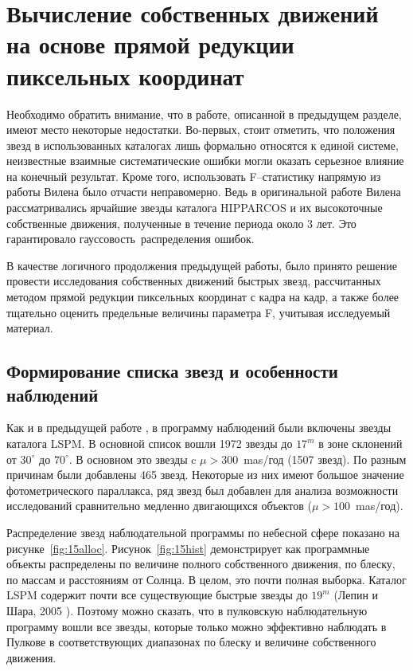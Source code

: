 \section{Вычисление собственных движений на основе прямой редукции пиксельных координат} \label{sec:ch3/sect2}
Необходимо обратить внимание, что в работе, описанной в предыдущем разделе, имеют место некоторые недостатки. Во-первых, стоит отметить, что положения звезд в использованных каталогах лишь формально относятся к единой системе, неизвестные взаимные систематические ошибки могли оказать серьезное влияние на конечный результат. Кроме того, использовать F--статистику напрямую из работы Вилена было отчасти неправомерно. Ведь в оригинальной работе Вилена рассматривались ярчайшие звезды каталога HIPPARCOS и их высокоточные собственные движения, полученные в течение периода около 3 лет. Это гарантировало \glqq гауссовость\grqq\  распределения ошибок.

В качестве логичного продолжения предыдущей работы, было принято решение провести исследования собственных движений быстрых звезд, рассчитанных методом прямой редукции пиксельных координат с кадра на кадр, а также более тщательно оценить предельные величины параметра F, учитывая исследуемый материал.
\subsection{Формирование списка звезд и особенности наблюдений} \label{subsec:ch3/sect2/sub1}
Как и в предыдущей работе \cite{2011AstL...37..420K}, в программу наблюдений были включены звезды каталога LSPM. В основной список вошли 1972 звезды до $17^m$ в зоне склонений от $30^{\circ}$ до $70^{\circ}$. В основном это звезды c $\mu>300$~mas/год (1507 звезд). По разным причинам были добавлены 465 звезд. Некоторые из них имеют большое значение фотометрического параллакса, ряд звезд был добавлен для анализа возможности исследований сравнительно медленно двигающихся объектов ($\mu>100$~mas/год).

Распределение звезд наблюдательной программы по небесной сфере показано на рисунке~\ref{fig:15alloc}. Рисунок~\ref{fig:15hist} демонстрирует как программные объекты распределены по величине полного собственного движения, по блеску, по массам и расстояниям от Солнца. В целом, это почти полная выборка. Каталог LSPM содержит почти все существующие быстрые звезды до $19^m$ (Лепин и Шара, 2005 ). Поэтому можно сказать, что в пулковскую наблюдательную программу вошли все звезды, которые только можно эффективно наблюдать в Пулкове в соответствующих диапазонах по блеску и величине собственного движения.

